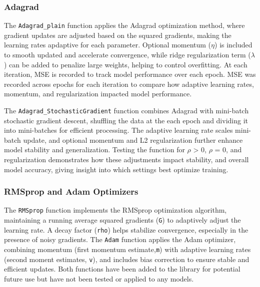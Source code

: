 \documentclass{article}
\newcommand{\0}{\mathbf{0}}
\newcommand{\1}{\mathbf{1}}
\begin{document}
\subsubsection{Adagrad} 
The \texttt{Adagrad\_plain} function applies the Adagrad optimization method, where gradient updates are adjusted based on the squared gradients, making the learning rates apdaptive for each parameter. Optional momentum (\(\eta\)) is included to smooth updated and accelerate convergence, while ridge regularization term (\(\lambda\)) can be added to penalize large weights, helping to control overfitting. At each iteration, MSE is recorded to track model performance over each epoch. MSE was recorded across epochs for each iteration to compare how adaptive learning rates, momentum, and regularization impacted model performance.

The \texttt{Adagrad\_StochasticGradient} function combines Adagrad with mini-batch stochastic gradient descent, shuffling the data at the each epoch and dividing it into mini-batches for efficient processing. The adaptive learning rate scales mini-batch update, and optional momentum and L2 regularization further enhance model stability and generalization. Testing the function for \(\rho\) > 0, \(\rho\) = 0, and regularization demonstrates how these adjustments impact stability, and overall model accuracy, giving insight into which settings best optimize training.  

     \subsubsection{RMSprop and Adam Optimizers}
The \texttt{RMSprop} function implements the RMSprop optimization algorithm, maintaining a running average squared gradients (\texttt{G}) to adaptively adjust the learning rate. A decay factor (\texttt{rho}) helps stabilize convergence, especially in the presence of noisy gradients. The \texttt{Adam} function applies the Adam optimizer, combining momentum (first momentum estimate,\texttt{m}) with adaptive learning rates (second moment estimates, \texttt{v}), and includes bias correction to ensure stable and efficient updates. Both functions have been added to the library for potential future use but have not been tested or applied to any models.
    
\end{document}
